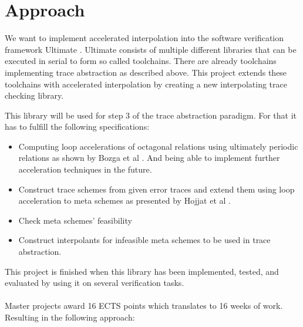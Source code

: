 \documentclass{article}
\begin{document}
\section{Approach}
We want to implement accelerated interpolation into the software verification framework Ultimate \cite{Zitat02}. Ultimate consists of multiple different libraries that can be executed in serial to form so called toolchains. There are already toolchains implementing trace abstraction as described above. This project extends these toolchains with accelerated interpolation by creating a new interpolating trace checking library. \par 
This library will be used for step 3 of the trace abstraction paradigm. For that it has to fulfill the following specifications: 
\begin{itemize}
	\item Computing loop accelerations of octagonal relations using ultimately periodic relations as shown by Bozga et al \cite{10.1007/978-3-642-14295-6_23}. And being able to implement further acceleration techniques in the future.
	\item Construct trace schemes from given error traces and extend them using loop acceleration to meta schemes as presented by Hojjat et al \cite{10.1007/978-3-642-33386-6_16}.
	\item Check meta schemes' feasibility
	\item Construct interpolants for infeasible meta schemes to be used in trace abstraction.
\end{itemize}
This project is finished when this library has been implemented, tested, and evaluated by using it on several verification tasks. \\ \\
Master projects award 16 ECTS points which translates to 16 weeks of work. Resulting in the following approach:
\end{document}
